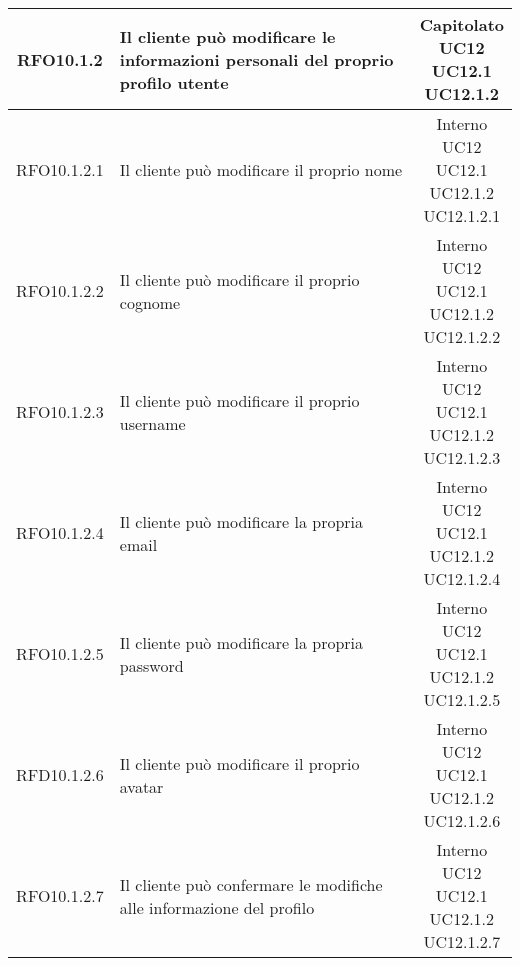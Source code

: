 \begin{longtable}{|c|p{8cm}|c|}
\hypertarget{RFO10.1.2}{RFO10.1.2} & Il cliente può modificare le informazioni personali del proprio profilo utente &\makecell*{Capitolato\\UC12\\UC12.1\\UC12.1.2} \\
\hline

\hypertarget{RFO10.1.2.1}{RFO10.1.2.1} & Il cliente può modificare il proprio nome & \makecell*{Interno\\UC12\\UC12.1\\UC12.1.2\\UC12.1.2.1} \\
\hline
\hypertarget{RFO10.1.2.2}{RFO10.1.2.2} & Il cliente può modificare il proprio cognome & \makecell*{Interno\\UC12\\UC12.1\\UC12.1.2\\UC12.1.2.2} \\
\hline
\hypertarget{RFO10.1.2.3}{RFO10.1.2.3} & Il cliente può modificare il proprio username & \makecell*{Interno\\UC12\\UC12.1\\UC12.1.2\\UC12.1.2.3} \\
\hline
\hypertarget{RFO10.1.2.4}{RFO10.1.2.4} & Il cliente può modificare la propria email & \makecell*{Interno\\UC12\\UC12.1\\UC12.1.2\\UC12.1.2.4} \\
\hline
\hypertarget{RFO10.1.2.5}{RFO10.1.2.5} & Il cliente può modificare la propria password & \makecell*{Interno\\UC12\\UC12.1\\UC12.1.2\\UC12.1.2.5} \\
\hline
\hypertarget{RFD10.1.2.6}{RFD10.1.2.6} & Il cliente può modificare il proprio avatar & \makecell*{Interno\\UC12\\UC12.1\\UC12.1.2\\UC12.1.2.6} \\
\hline
\hypertarget{RFO10.1.2.7}{RFO10.1.2.7} & Il cliente può confermare le modifiche alle informazione del profilo & \makecell*{Interno\\UC12\\UC12.1\\UC12.1.2\\UC12.1.2.7} \\

\end{longtable}
